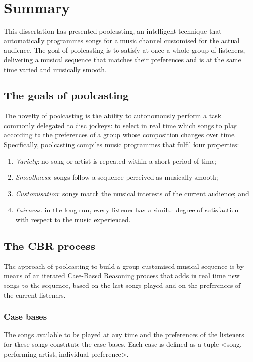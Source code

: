 \section{Summary} %

This dissertation has presented poolcasting, an intelligent technique that automatically programmes songs for a music channel customised for the actual audience.
The goal of poolcasting is to satisfy at once a whole group of listeners, delivering a musical sequence that matches their preferences and is at the same time varied and musically smooth.

\subsection{The goals of poolcasting} %

The novelty of poolcasting is the ability to autonomously perform a task commonly delegated to disc jockeys: to select in real time which songs to play according to the preferences of a group whose composition changes over time.
Specifically, poolcasting compiles music programmes that fulfil four properties:
\begin{enumerate}
 \item \emph{Variety}: no song or artist is repeated within a short period of time;
 \item \emph{Smoothness}: songs follow a sequence perceived as musically smooth;
 \item \emph{Customisation}: songs match the musical interests of the current audience; and
 \item \emph{Fairness}: in the long run, every listener has a similar degree of  satisfaction with respect to the music experienced.
\end{enumerate}


\subsection{The CBR process} %

The approach of poolcasting to build a group-customised musical sequence is by means of an iterated Case-Based Reasoning process that adds in real time new songs to the sequence, based on the last songs played and on the preferences of the current listeners. 

\subsubsection{Case bases} %
The songs available to be played at any time and the preferences of the listeners for these songs constitute the case bases.
Each case is defined as a tuple <song, performing artist, individual preference>.

